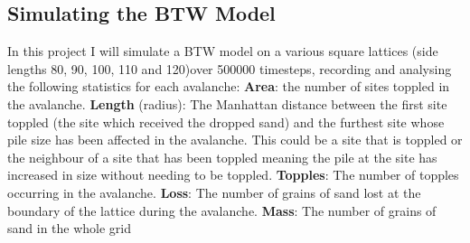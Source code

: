 \documentclass{article}
\begin{document}
\subsection{Simulating the BTW Model}
In this project I will simulate a BTW model on a various square lattices (side lengths 80, 90, 100, 110 and 120)over 500000 timesteps, recording and analysing the following statistics for each avalanche:
\newline
\newline
\textbf{Area}: the number of sites toppled in the avalanche.
\newline
\newline
\textbf{Length} (radius): The Manhattan distance between the first site toppled (the site which received the dropped sand) and the furthest site whose pile size has been affected in the avalanche. This could be a site that is toppled or the neighbour of a site that has been toppled meaning the pile at the site has increased in size without needing to be toppled.
\newline
\newline
\textbf{Topples}: The number of topples occurring in the avalanche.
\newline
\newline
\textbf{Loss}: The number of grains of sand lost at the boundary of the lattice during the avalanche. 
\newline
\newline
\textbf{Mass}: The number of grains of sand in the whole grid
\newline
\end{document}
